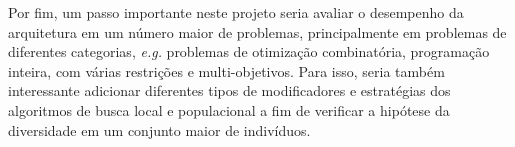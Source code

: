 Por fim, um passo importante neste projeto seria avaliar o desempenho da arquitetura em um número maior de problemas, principalmente em problemas de diferentes categorias, \textit{e.g.} problemas de otimização combinatória, programação inteira, com várias restrições e multi-objetivos. Para isso, seria também interessante adicionar diferentes tipos de modificadores e estratégias dos algoritmos de busca local e populacional a fim de verificar a hipótese da diversidade em um conjunto maior de indivíduos. 
